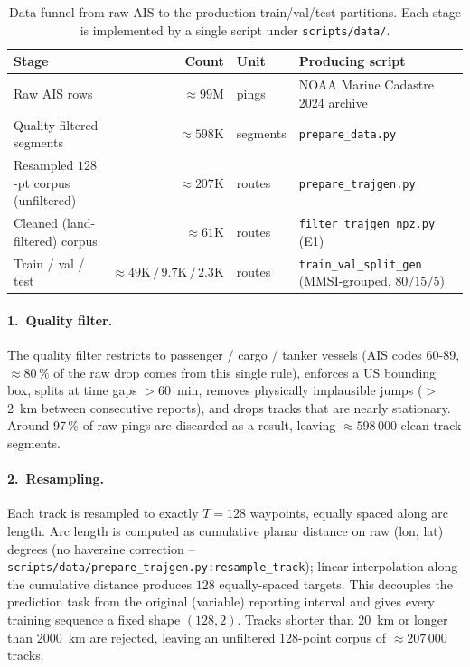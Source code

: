 \documentclass[oneside, a4paper, onecolumn, 11pt]{article}
\begin{document}
\begin{table}[h]
\centering
\caption{Data funnel from raw AIS to the production train/val/test
partitions.  Each stage is implemented by a single script under
\texttt{scripts/data/}.}
\label{tab:funnel}
\begin{tabular}{lrll}
\toprule
\textbf{Stage} & \textbf{Count} & \textbf{Unit} & \textbf{Producing script} \\
\midrule
Raw AIS rows                              & $\approx 99\text{M}$    & pings      & NOAA Marine Cadastre 2024 archive \\
Quality-filtered segments                 & $\approx 598\text{K}$   & segments   & \texttt{prepare\_data.py} \\
Resampled $128$-pt corpus (unfiltered)    & $\approx 207\text{K}$   & routes     & \texttt{prepare\_trajgen.py} \\
Cleaned (land-filtered) corpus            & $\approx 61\text{K}$    & routes     & \texttt{filter\_trajgen\_npz.py} (E1) \\
Train / val / test                        & $\approx 49\text{K}\,/\,9.7\text{K}\,/\,2.3\text{K}$ & routes & \texttt{train\_val\_split\_gen} (MMSI-grouped, $80/15/5$) \\
\bottomrule
\end{tabular}
\end{table}

\paragraph{1.~Quality filter.}
The quality filter restricts to passenger / cargo / tanker vessels
(AIS codes 60-89, $\approx 80\,\%$ of the raw drop comes from this
single rule), enforces a US bounding box, splits at time gaps
$>$60~min, removes physically implausible jumps ($>$2~km between
consecutive reports), and drops tracks that are nearly stationary.
Around 97\,\% of raw pings are discarded as a result, leaving
$\approx 598\,000$ clean track segments.

\paragraph{2.~Resampling.}
Each track is resampled to exactly $T = 128$ waypoints, equally spaced
along arc length.  Arc length is computed as cumulative planar distance
on raw (lon, lat) degrees (no haversine correction --
\texttt{scripts/data/prepare\_trajgen.py:resample\_track}); linear
interpolation along the cumulative distance produces $128$
equally-spaced targets.  This decouples the prediction task from the
original (variable) reporting interval and gives every training
sequence a fixed shape $(128, 2)$.  Tracks shorter than 20~km or
longer than 2000~km are rejected, leaving an unfiltered 128-point
corpus of $\approx 207\,000$ tracks.
\end{document}
